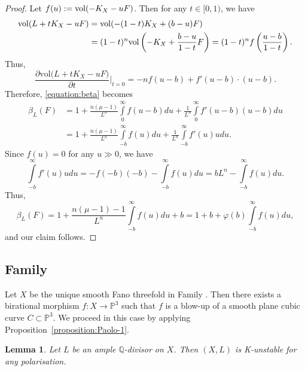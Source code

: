\documentclass[12pt]{amsart}
\newtheorem{lemma}[theorem]{Lemma}
\theoremstyle{definition}
\theoremstyle{remark}
\begin{document}
\begin{proof} Let $f(u):={\rm vol}(-K_X-uF)$. Then for any $t\in [0,1)$, we have
$$\begin{aligned}
{\rm vol}(L+tK_X-uF)&={\rm vol}(-(1-t)K_X+(b-u)F)\\
&= (1-t)^n {\rm vol}\left(-K_X+\frac{b-u}{1-t}F\right)=(1-t)^nf\left(\frac{u-b}{1-t}\right).
\end{aligned}$$
Thus,
$$\frac{\partial \mathrm{vol}\big(L+tK_X-uF\big)}{\partial t}\Big\vert_{t=0}=
-nf(u-b)+f'(u-b)\cdot (u-b).$$
Therefore, \eqref{equation:beta} becomes
$$\begin{aligned}
\beta_L(F)&=1+\frac{n(\mu-1)}{L^n}\int\limits_0^{\infty}f(u-b)du
+\frac 1 {L^n}\int\limits_0^\infty f'(u-b)(u-b)du\\
&=1+\frac{n(\mu-1)}{L^n}\int\limits_{-b}^\infty f(u)du +
\frac 1 {L^n}\int\limits_{-b}^\infty f'(u) u du.
\end{aligned}
$$
Since $f(u)=0$ for any $u\gg 0$, we have
$$\int\limits_{-b}^{\infty} f'(u)udu = -f(-b)(-b) - \int\limits_{-b}^\infty f(u)du=b L^n -\int\limits_{-b}^{\infty}f(u)du.$$
Thus,
$$
\beta_L(F)=1+ \frac {n(\mu-1)-1}{L^n}\int\limits_{-b}^\infty f(u)du+b=1+b+\varphi(b)\int\limits_{-b}^\infty f(u)du,
$$
and our claim follows.
\end{proof}



\subsection{Family }\label{subsection:2-28}

Let $X$ be the unique smooth Fano threefold in Family .
Then there exists a birational morphism $f\colon X\to\mathbb{P}^3$ such that $f$ is a blow-up of a smooth plane cubic curve $C\subset\mathbb{P}^3$.
We proceed in this case by applying Proposition~\ref{proposition:Paolo-1}.

\begin{lemma}
\label{example:2-28}
Let $L$ be an ample $\mathbb Q$-divisor on $X$.
Then $(X,L)$ is K-unstable for any polarisation.
\end{lemma}
\end{document}
